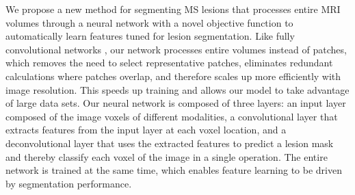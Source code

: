 We propose a new method for segmenting MS lesions that processes
entire MRI volumes through a neural network with a novel objective function to
automatically learn features tuned for lesion segmentation.
%
%
%
Like fully convolutional networks \cite{kang2014fully}, our network processes
entire volumes instead of patches, which removes
the need to select representative patches, eliminates redundant calculations
where patches overlap, and therefore scales up more efficiently with image
resolution. This speeds up training and allows our model to take advantage of
large data sets.
%
%
Our neural network is composed of three layers: an input layer composed of the
image voxels of different modalities, a convolutional layer \cite{LeCun1998}
that extracts features from the input layer at each voxel location, and a
deconvolutional layer \cite{zeiler2011} that uses the extracted features to
predict a lesion mask and thereby classify each voxel of the image in a single
operation. The entire network is trained at the same time, which enables feature
learning to be driven by segmentation performance.
%
% 
